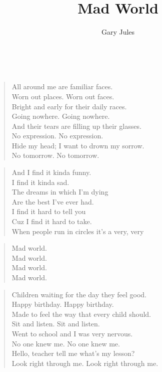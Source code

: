 \documentclass[9pt,a4paper,oneside, onecolumn]{article}
\author{Gary Jules}
\title{Mad World}
\date{}
\begin{document}
\maketitle
\thispagestyle{empty}

\mbox{
}\\

\begin{verse}
\qquad All around me are familiar faces.\\
Worn out places.  Worn out faces.\\
Bright and early for their daily races.\\
Going nowhere.  Going nowhere.\\
And their tears are filling up their glasses.\\
No expression.  No expression.\\
Hide my head; I want to drown my sorrow.\\
No tomorrow.  No tomorrow.\\
\end{verse}

\begin{verse}
\qquad And I find it kinda funny.\\
I find it kinda sad.\\
The dreams in which I'm dying\\
Are the best I've ever had.\\
I find it hard to tell you\\
Cuz I find it hard to take.\\
When people run in circles it's a very, very\\
\end{verse}

\begin{verse}
\qquad {}Mad world.\\
\qquad Mad world.\\
\qquad Mad world.\\
\qquad Mad world.\\
\end{verse}

\begin{verse}
Children waiting for the day they feel good.\\
Happy birthday.  Happy birthday.\\
Made to feel the way that every child should.\\
Sit and listen.  Sit and listen.\\
Went to school and I was very nervous.\\
No one knew me.  No one knew me.\\
Hello, teacher tell me what's my lesson?\\
Look right through me.  Look right through me.\\
\end{verse}
\end{document}
